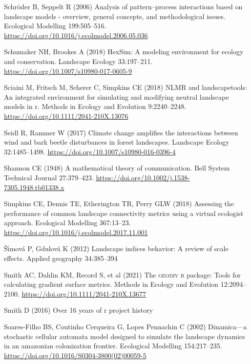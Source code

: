 \documentclass[
  10pt,
  a4paperpaper,
]{article}
\newlength{\cslhangindent}
\newenvironment{CSLReferences}[2] %
 {\begin{list}{}{%
  \setlength{\itemindent}{0pt}
  \setlength{\leftmargin}{0pt}
  \setlength{\parsep}{0pt}
  \ifodd #1
   \setlength{\leftmargin}{\cslhangindent}
   \setlength{\itemindent}{-1\cslhangindent}
  \fi
  \setlength{\itemsep}{#2\baselineskip}}}
 {\end{list}}
\begin{document}
\begin{CSLReferences}{1}{1}
Schröder B, Seppelt R (2006) Analysis of pattern--process interactions
based on landscape models - overview, general concepts, and
methodological issues. Ecological Modelling 199:505--516.
\url{https://doi.org/10.1016/j.ecolmodel.2006.05.036}

Schumaker NH, Brookes A (2018) HexSim: A modeling environment for
ecology and conservation. Landscape Ecology 33:197--211.
\url{https://doi.org/10.1007/s10980-017-0605-9}

Sciaini M, Fritsch M, Scherer C, Simpkins CE (2018) NLMR and
landscapetools: An integrated environment for simulating and modifying
neutral landscape models in r. Methods in Ecology and Evolution
9:2240--2248. \url{https://doi.org/10.1111/2041-210X.13076}

Seidl R, Rammer W (2017) Climate change amplifies the interactions
between wind and bark beetle disturbances in forest landscapes.
Landscape Ecology 32:1485--1498.
\url{https://doi.org/10.1007/s10980-016-0396-4}

Shannon CE (1948) A mathematical theory of communication. Bell System
Technical Journal 27:379--423.
\url{https://doi.org/10.1002/j.1538-7305.1948.tb01338.x}

Simpkins CE, Dennis TE, Etherington TR, Perry GLW (2018) Assessing the
performance of common landscape connectivity metrics using a virtual
ecologist approach. Ecological Modelling 367:13--23.
\url{https://doi.org/10.1016/j.ecolmodel.2017.11.001}

Šı́mová P, Gdulová K (2012) Landscape indices behavior: A review of scale
effects. Applied geography 34:385--394

Smith AC, Dahlin KM, Record S, et al (2021) The {\textsc{geodiv r}}
package: Tools for calculating gradient surface metrics. Methods in
Ecology and Evolution 12:2094--2100.
\url{https://doi.org/10.1111/2041-210X.13677}

Smith D (2016) Over 16 years of r project history

Soares-Filho BS, Coutinho Cerqueira G, Lopes Pennachin C (2002)
Dinamica---a stochastic cellular automata model designed to simulate the
landscape dynamics in an amazonian colonization frontier. Ecological
Modelling 154:217--235.
\url{https://doi.org/10.1016/S0304-3800(02)00059-5}


\end{CSLReferences}
\end{document}
